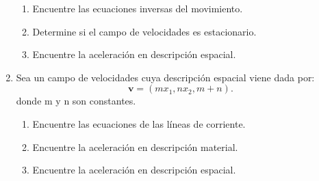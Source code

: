 \documentclass[12pt,a4paper]{article}
\begin{document}
\begin{enumerate}
        \begin{enumerate}
            \item Encuentre las ecuaciones inversas del movimiento.
            \item Determine si el campo de velocidades es estacionario.
            \item Encuentre la aceleración en descripción espacial.
        \end{enumerate}
        \item Sea un campo de velocidades cuya descripción espacial viene dada por:
            \begin{equation}
                \mathbf{v}=\left(mx_1,nx_2,m+n\right).
            \end{equation}
            donde m y n son constantes.
            \begin{enumerate}
                \item Encuentre las ecuaciones de las líneas de corriente.
                \item Encuentre la aceleración en descripción material.
                \item Encuentre la aceleración en descripción espacial.
            \end{enumerate}
\end{enumerate}
\end{document}
